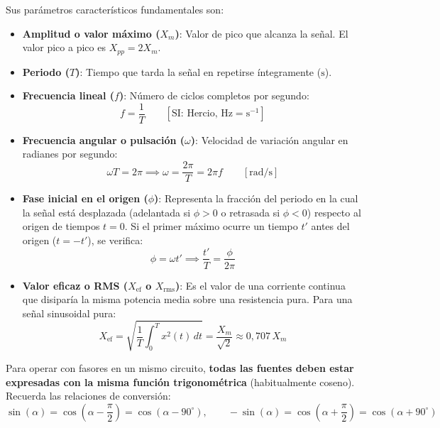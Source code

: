 Sus parámetros característicos fundamentales son:
\begin{itemize}
    \item \textbf{Amplitud o valor máximo ($X_m$)}: Valor de pico que alcanza la señal. El valor pico a pico es $X_{pp} = 2 X_m$.
    \item \textbf{Periodo ($T$)}: Tiempo que tarda la señal en repetirse íntegramente ($\si{\second}$).
    \item \textbf{Frecuencia lineal ($f$)}: Número de ciclos completos por segundo:
    \begin{equation}
        f = \frac{1}{T} \qquad [\text{SI: Hercio, }\si{\hertz} = \si{\second^{-1}}]
    \end{equation}
    \item \textbf{Frecuencia angular o pulsación ($\omega$)}: Velocidad de variación angular en radianes por segundo:
    \begin{equation}
        \omega T = 2\pi \implies \omega = \frac{2\pi}{T} = 2\pi f \qquad [\si{\radian/\second}]
    \end{equation}
    \item \textbf{Fase inicial en el origen ($\phi$)}: Representa la fracción del periodo en la cual la señal está desplazada (adelantada si $\phi > 0$ o retrasada si $\phi < 0$) respecto al origen de tiempos $t = 0$. Si el primer máximo ocurre un tiempo $t'$ antes del origen ($t = -t'$), se verifica:
    \begin{equation}
        \phi = \omega t' \implies \frac{t'}{T} = \frac{\phi}{2\pi}
    \end{equation}
    \item \textbf{Valor eficaz o RMS ($X_{\text{ef}}$ o $X_{\text{rms}}$)}: Es el valor de una corriente continua que disiparía la misma potencia media sobre una resistencia pura. Para una señal sinusoidal pura:
    \begin{equation}
        X_{\text{ef}} = \sqrt{\frac{1}{T}\int_0^T x^2(t)\,dt} = \frac{X_m}{\sqrt{2}} \approx 0{,}707\,X_m
    \end{equation}
\end{itemize}

\begin{aviso}
Para operar con fasores en un mismo circuito, \textbf{todas las fuentes deben estar expresadas con la misma función trigonométrica} (habitualmente coseno). Recuerda las relaciones de conversión:
\begin{equation}
    \sin(\alpha) = \cos\left(\alpha - \frac{\pi}{2}\right) = \cos(\alpha - 90^\circ), \qquad -\sin(\alpha) = \cos\left(\alpha + \frac{\pi}{2}\right) = \cos(\alpha + 90^\circ)
\end{equation}
\end{aviso}

